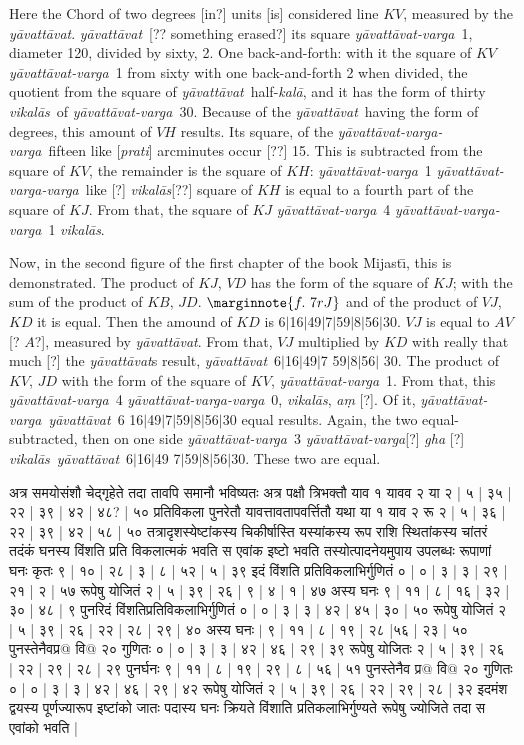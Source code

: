 \documentclass[12pt]{book}
\let\*=\d
\def\kala{\textit{ka\-l\=a}}
\def\ya{\textit{y\=avat\-t\=avat}}
\def\yava{\textit{y\=avat\-t\=avat-varga}}
\def\yavava{\textit{y\=avat\-t\=avat-varga-varga}}
\def\vikalas{\textit{vi\-ka\-l\=as}}
\def\danda{$|$}
\begin{document}
\newpage

Here the Chord of two degrees [in?] units [is] considered line $KV$, measured by the \ya. 
\ya\ [?? something erased?] its square \yava\ 1, diameter 120, divided by sixty, 2. 
One back-and-forth: with it the square of $KV$ \yava\ 1 from sixty with one back-and-forth 2
when divided, the quotient from the square of \ya\ half-\kala, and it has the form of thirty \vikalas\
of \yava\ 30. Because of the \ya\ having the form of degrees, this amount of 
$VH$ results. Its square,  of the \yavava\ fifteen like [\textit{prati}] arcminutes occur [??] 15. 
This is subtracted from the square of $KV$, the remainder is the square of $KH$: 
\yava\ 1 \yavava\ like [?] \vikalas [??] square of $KH$ is equal to a fourth part of the
square of $KJ$. From that, the square of $KJ$ \yava\ 4 \yavava\ 1 \vikalas.

Now, in the second figure of the first chapter of the book Mijast\={\i}, this is demonstrated.
The product of $KJ$, $VD$ has the form of the square of $KJ$; with
the sum of the product of $KB$, $JD$. 
$\marginnote{f.~7r J}$
and of the product of $VJ$, $KD$ it is equal.  Then the amound of $KD$ is 
6\danda 16\danda 49\danda 7\danda 59\danda 8\danda 56\danda 30.  $VJ$ is equal to 
$AV$ [? $A$?], measured by \ya.  From that, $VJ$ multiplied by $KD$ with really
that much [?] the \ya s result, \ya\ 6\danda 16\danda 49\danda 7 59\danda 8\danda 56\danda
30. 
The product of $KV$, $JD$ with the form of
the square of $KV$, \yava\ 1. From that, this \yava\ 4 \yavava\ 0, \vikalas, 
\textit{a\*m} [?]. Of it, \yava\ \ya\ 6 16\danda 49\danda 7\danda 59\danda 8\danda 56\danda 30
equal results. Again, the two equal-subtracted, then on one side \yava\ 3 \yava  [?] \textit{gha} [?]
\vikalas\ \ya\ 6\danda 16\danda 49 7\danda 59\danda 8\danda 56\danda 30. These two are equal.

\newpage


{\s अत्र समयोसंशौ चेद्गृहेते तदा तावपि
समानौ भविष्यतः अत्र पक्षौ त्रिभक्तौ याव १ यावव २
या २ | ५ | ३५ | २२ | ३९ | ४२ | ४८? | ५० प्रतिविकला
पुनरेतौ यावत्तावतापवर्त्तितौ यथा या १
याव २ रू २ | ५ | ३६ | २२ | ३९ | ४२ | ५८ | ५०
तत्रादृशस्येष्टांकस्य चिकीर्षास्ति यस्यांकस्य रूप राशि
स्थितांकस्य चांतरं तदंकं घनस्य विंशति
प्रति विकलात्मकं भवति स एवांक इष्टो भवति तस्योत्पादनेयमुपाय उपलब्धः रूपाणां घनः कृतः ९ | १० | २८ | ३ | ८ | ५२ | ५ | ३९
इदं विंशति प्रतिविकलाभिर्गुणितं ० | ० | ३ | ३ | २९ | २१ | २ | ५७ रूपेषु योजितं २ | ५ | ३९ | २६ | ९ | ४ | १ | ४७ अस्य घनः ९ | ११ | ८ | १६ | ३२ | ३० | ४८ | ९ पुनरिदं विंशतिप्रतिविकलाभिर्गुणितं ० | ० | ३ | ३ | ४२ | ४५ | ३० | ५०
रूपेषु योजितं २ | ५ | ३९ | २६ | २२ | २८ | २९ | ४० अस्य घनः $|$\marginnote{f.~7v J}  
९ | ११ | ८ | १९ | २८ |५६ | २३ | ५० पुनस्तेनैवप्र@ वि@
२० गुणितः ० | ० | ३ | ३ | ४२ | ४६ | २९ | ३९
रूपेषु योजितः २ | ५ | ३९ | २६ | २२ | २९ | २८ | २९ पुनर्घनः ९ | ११ | ८ | १९ | २९ | ८ | ५६ | ५१ पुनस्तेनैव प्र@ वि@ २० गुणितः ० | ० | ३ | ३ | ४२ | ४६ | २९ | ४२
रूपेषु योजितं २ | ५ | ३९ | २६ | २२ | २९ | २८ | ३२
इदमंश द्वयस्य पूर्णज्यारूप इष्टांको जातः पदास्य घनः क्रियते विंशाति प्रतिकलाभिर्गुण्यते
रूपेषु ज्योजिते तदा स एवांको भवति |} 
\end{document}
